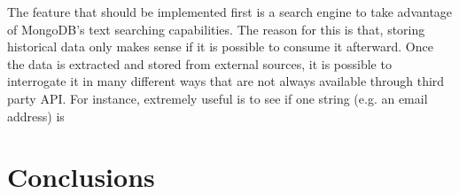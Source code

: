 The feature that should be implemented first is a search engine to take
advantage of MongoDB's text searching capabilities. The reason for this is that,
storing historical data only makes sense if it is possible to consume it
afterward. Once the data is extracted and stored from external sources, it is
possible to interrogate it in many different ways that are not always available
through third party API. For instance, extremely useful is to see if one string
(e.g. an email address) is 

\section{Conclusions}

